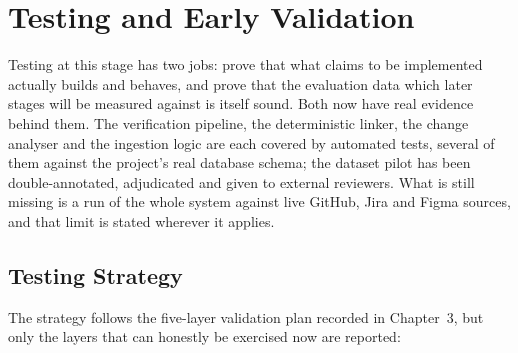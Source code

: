 \chapter{Testing and Early Validation}
\label{ch:testing}

Testing at this stage has two jobs: prove that what claims to be implemented
actually builds and behaves, and prove that the evaluation data which later
stages will be measured against is itself sound. Both now have real evidence
behind them. The verification pipeline, the deterministic linker, the change
analyser and the ingestion logic are each covered by automated tests, several of
them against the project's real database schema; the dataset pilot has been
double-annotated, adjudicated and given to external reviewers. What is still
missing is a run of the whole system against live GitHub, Jira and Figma
sources, and that limit is stated wherever it applies.

\section{Testing Strategy}
\label{sec:test-strategy}

The strategy follows the five-layer validation plan recorded in Chapter~3, but
only the layers that can honestly be exercised now are reported:

